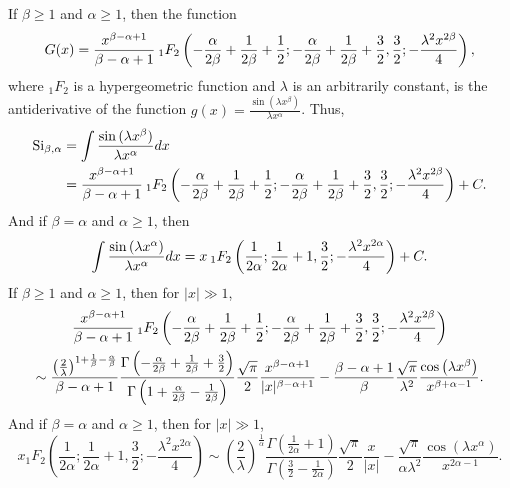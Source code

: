 \documentclass[smallextended]{svjour3}
\begin{document}
\begin{theorem}
If $\beta\ge1$ and $\alpha\ge1$, then the function
$$G(x)=\frac{x^{\beta-\alpha+1}}{\beta-\alpha+1}\hspace{.075cm} _{1}F_{2}\left(-\frac{\alpha}{2\beta}+\frac{1}{2\beta}+\frac{1}{2};-\frac{\alpha}{2\beta}+\frac{1}{2\beta}+\frac{3}{2},\frac{3}{2};-\frac{\lambda^2 x^{2\beta}}{4}\right),$$
where ${}_1F_2$ is a hypergeometric function \cite{AS} and $\lambda$ is an arbitrarily constant, is the antiderivative of the function $g(x)=\frac{\sin{(\lambda x^\beta)
}}{\lambda x^\alpha}$. Thus,
\begin{align}
\text{Si}_{\beta,\alpha}&=\int\frac{\sin{(\lambda x^\beta)}}{\lambda x^\alpha}dx\nonumber\\& =\frac{x^{\beta-\alpha+1}}{\beta-\alpha+1}\hspace{.075cm} _{1}F_{2}\left(-\frac{\alpha}{2\beta}+\frac{1}{2\beta}+\frac{1}{2};-\frac{\alpha}{2\beta}+\frac{1}{2\beta}+\frac{3}{2},\frac{3}{2};-\frac{\lambda^2 x^{2\beta}}{4}\right)+C.
\label{Thm1-1}
\end{align}
And if $\beta=\alpha$ and $\alpha\ge1$, then
\begin{equation}
\int\frac{\sin{(\lambda x^\alpha)}}{\lambda x^\alpha}dx={x}\hspace{.075cm} _{1}F_{2}\left(\frac{1}{2\alpha};\frac{1}{2\alpha}+1,\frac{3}{2};-\frac{\lambda^2 x^{2\alpha}}{4}\right)+C.
\label{Thm1-2}
\end{equation}
If $\beta\ge1$ and $\alpha\ge1$, then for $|x|\gg1$,
\begin{multline}
\frac{x^{\beta-\alpha+1}}{\beta-\alpha+1}\hspace{.075cm}_{1}F_{2}\left(-\frac{\alpha}{2\beta}+\frac{1}{2\beta}+\frac{1}{2};-\frac{\alpha}{2\beta}+\frac{1}{2\beta}+\frac{3}{2},\frac{3}{2};-\frac{\lambda^2 x^{2\beta}}{4}\right)\\\sim\frac{\left(\frac{2}{\lambda}\right)^{1+\frac{1}{\beta}-\frac{\alpha}{\beta}}}{\beta-\alpha+1}\frac{\Gamma\left(-\frac{\alpha}{2\beta}+\frac{1}{2\beta}+\frac{3}{2}\right)}
{\Gamma\left(1+\frac{\alpha}{2\beta}-\frac{1}{2\beta}\right)}\frac{\sqrt{\pi}}{2}
\frac{x^{\beta-\alpha+1}}{|x|^{\beta-\alpha+1}}
-\frac{\beta-\alpha+1}{\beta}\frac{\sqrt{\pi}}{\lambda^2}\frac{\cos{\left({\lambda x^\beta}\right)}}{x^{\beta+\alpha-1}}. 
\label{Thm1-3}
\end{multline}
And if $\beta=\alpha$ and $\alpha\ge1$, then for $|x|\gg1$,
\begin{equation}
x{}_1F_2\left(\frac{1}{2\alpha};\frac{1}{2\alpha}+1,\frac{3}{2};-\frac{\lambda^2 x^{2\alpha}}{4}\right)\sim\left(\frac{2}{\lambda}\right)^{\frac{1}{\alpha}}\frac{\Gamma\left(\frac{1}{2\alpha}+1\right)}{\Gamma\left(\frac{3}{2}-\frac{1}{2\alpha}\right)}\frac{\sqrt{\pi}}{2}
\frac{x}{|x|}
-\frac{\sqrt{\pi}}{\alpha\lambda^2}\frac{\cos{\left({\lambda x^\alpha}\right)}}{x^{2\alpha-1}}. 
\label{Thm1-4}
\end{equation}
\label{Thm1}
\end{theorem}
\end{document}

